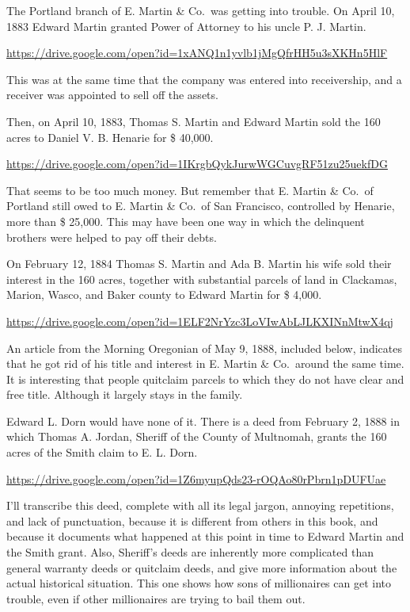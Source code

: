 \documentclass[
  12pt,
]{book}
\begin{document}
The Portland branch of E. Martin \& Co.~was getting into trouble. On April 10, 1883 Edward Martin granted Power of Attorney to his uncle P. J. Martin.

\url{https://drive.google.com/open?id=1xANQ1n1yvlb1jMgQfrHH5u3sXKHn5HlF}

This was at the same time that the company was entered into receivership, and a receiver was appointed to sell off the assets.

Then, on April 10, 1883, Thomas S. Martin and Edward Martin sold the 160 acres to Daniel V. B. Henarie for \$ 40,000.

\url{https://drive.google.com/open?id=1IKrgbQykJurwWGCuvgRF51zu25uekfDG}

That seems to be too much money. But remember that E. Martin \& Co.~of Portland still owed to E. Martin \& Co.~of San Francisco, controlled by Henarie, more than \$ 25,000. This may have been one way in which the delinquent brothers were helped to pay off their debts.

On February 12, 1884 Thomas S. Martin and Ada B. Martin his wife sold their interest in the 160 acres, together with substantial parcels of land in Clackamas, Marion, Wasco, and Baker county to Edward Martin for \$ 4,000.

\url{https://drive.google.com/open?id=1ELF2NrYzc3LoVIwAbLJLKXINnMtwX4qj}

An article from the Morning Oregonian of May 9, 1888, included below, indicates that he got rid of his title and interest in E. Martin \& Co.~around the same time. It is interesting that people quitclaim parcels to which they do not have clear and free title. Although it largely stays in the family.

Edward L. Dorn would have none of it. There is a deed from February 2, 1888 in which Thomas A. Jordan, Sheriff of the County of Multnomah, grants the 160 acres of the Smith claim to E. L. Dorn.

\url{https://drive.google.com/open?id=1Z6myupQds23-rOQAo80rPbrn1pDUFUae}

I'll transcribe this deed, complete with all its legal jargon, annoying repetitions, and lack of punctuation, because it is different from others in this book, and because it documents what happened at this point in time to Edward Martin and the Smith grant. Also, Sheriff's deeds are inherently more complicated than general warranty deeds or quitclaim deeds, and give more information about the actual historical situation. This one shows how sons of millionaires can get into trouble, even if other millionaires are trying to bail them out.
\end{document}
